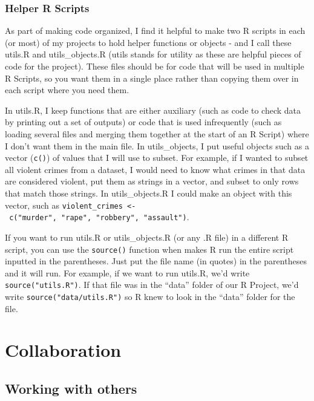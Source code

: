 \documentclass[
  12pt,
]{book}
\begin{document}
\hypertarget{helper-r-scripts}{%
\subsection{Helper R Scripts}\label{helper-r-scripts}}

As part of making code organized, I find it helpful to make two R scripts in each (or most) of my projects to hold helper functions or objects - and I call these utils.R and utils\_objects.R (utils stands for utility as these are helpful pieces of code for the project). These files should be for code that will be used in multiple R Scripts, so you want them in a single place rather than copying them over in each script where you need them.

In utils.R, I keep functions that are either auxiliary (such as code to check data by printing out a set of outputs) or code that is used infrequently (such as loading several files and merging them together at the start of an R Script) where I don't want them in the main file. In utils\_objects, I put useful objects such as a vector (\texttt{c()}) of values that I will use to subset. For example, if I wanted to subset all violent crimes from a dataset, I would need to know what crimes in that data are considered violent, put them as strings in a vector, and subset to only rows that match those strings. In utils\_objects.R I could make an object with this vector, such as \texttt{violent\_crimes\ \textless{}-\ c("murder",\ "rape",\ "robbery",\ "assault")}.

If you want to run utils.R or utils\_objects.R (or any .R file) in a different R script, you can use the \texttt{source()} function when makes R run the entire script inputted in the parentheses. Just put the file name (in quotes) in the parentheses and it will run. For example, if we want to run utils.R, we'd write \texttt{source("utils.R")}. If that file was in the ``data'' folder of our R Project, we'd write \texttt{source("data/utils.R")} so R knew to look in the ``data'' folder for the file.

\hypertarget{collaboration}{%
\chapter{Collaboration}\label{collaboration}}

\hypertarget{working-with-others}{%
\section{Working with others}\label{working-with-others}}
\end{document}
